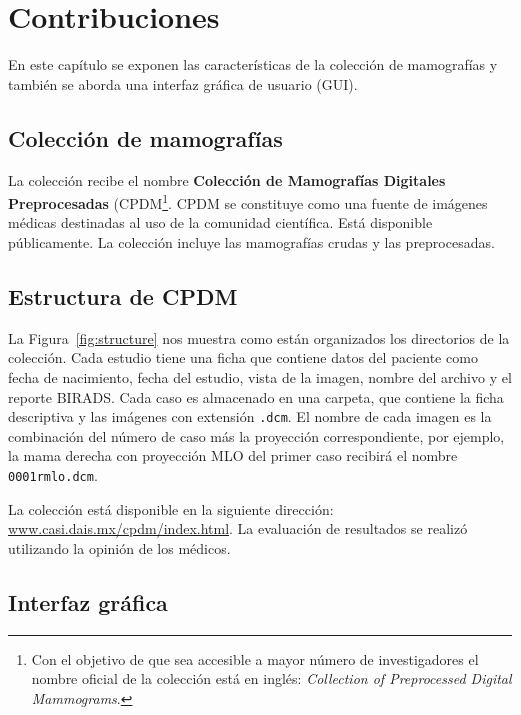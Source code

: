 \chapter{Contribuciones}
\label{resultados}

En este capítulo se exponen las características de la colección de mamografías y
también se aborda una interfaz gráfica de usuario (GUI).

\section{Colección de mamografías}

La colección recibe el nombre \textbf{Colección de Mamografías Digitales
Preprocesadas} (CPDM\footnote{Con el objetivo de que sea accesible a mayor
número de investigadores el nombre oficial de la colección está en inglés:
\textit{Collection of Preprocessed Digital Mammograms}.}. CPDM se constituye
como una fuente de imágenes médicas destinadas al uso de la comunidad
científica. Está disponible públicamente. La colección incluye las mamografías
crudas y las preprocesadas. 

\section{Estructura de CPDM}

La Figura~\ref{fig:structure} nos muestra como están organizados los
directorios de la colección. Cada estudio tiene una ficha que contiene datos
del paciente como fecha de nacimiento, fecha del estudio, vista de la imagen,
nombre del archivo y el reporte BIRADS. Cada caso es almacenado en una carpeta,
que contiene la ficha descriptiva y las imágenes con extensión \texttt{.dcm}.
El nombre de cada imagen es la combinación del número de caso más la proyección
correspondiente, por ejemplo, la mama derecha con proyección MLO del primer
caso recibirá el nombre \texttt{0001rmlo.dcm}.

La colección está disponible en la siguiente dirección:
\url{www.casi.dais.mx/cpdm/index.html}. La evaluación de resultados se realizó
utilizando la opinión de los médicos.

\shorthandoff{>} %
    
\shorthandon{>} 

\section{Interfaz gráfica}

